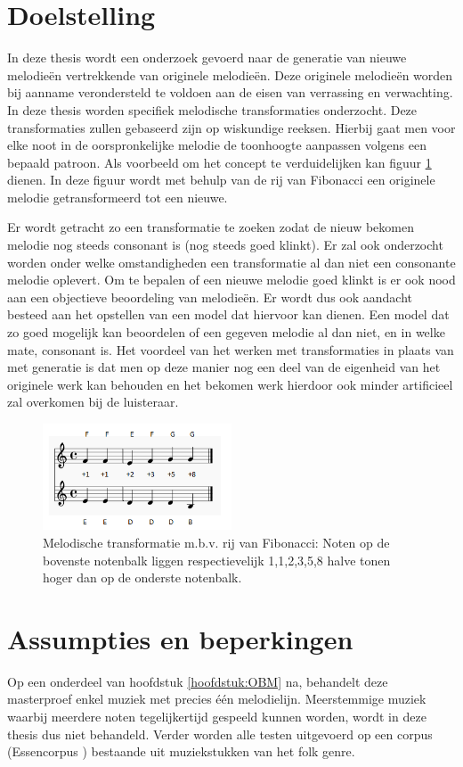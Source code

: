 \section{Doelstelling}
In deze thesis wordt een onderzoek gevoerd naar de generatie van nieuwe melodie\"en vertrekkende van originele melodie\"en. Deze originele melodie\"en worden bij aanname verondersteld te voldoen aan de eisen van verrassing en verwachting. In deze thesis worden specifiek melodische transformaties onderzocht. Deze transformaties zullen gebaseerd zijn op wiskundige reeksen. Hierbij gaat men voor elke noot in de oorspronkelijke melodie de toonhoogte aanpassen volgens een bepaald patroon. Als voorbeeld om het concept te verduidelijken kan figuur \ref{figuur:fibo} dienen. In deze figuur wordt met behulp van de rij van Fibonacci een originele melodie getransformeerd tot een nieuwe. 

Er wordt getracht zo een transformatie te zoeken zodat de nieuw bekomen melodie nog steeds consonant is (nog steeds goed klinkt). Er zal ook onderzocht worden onder welke omstandigheden een transformatie al dan niet een consonante melodie oplevert. Om te bepalen of een nieuwe melodie goed klinkt is er ook nood aan een objectieve beoordeling van melodie\"en. Er wordt dus ook aandacht besteed aan het opstellen van een model dat hiervoor kan dienen. Een model dat zo goed mogelijk kan beoordelen of een gegeven melodie al dan niet, en in welke mate, consonant is. Het voordeel van het werken met transformaties in plaats van met generatie is dat men op deze manier nog een deel van de eigenheid van het originele werk kan behouden en het bekomen werk hierdoor ook minder artificieel zal overkomen bij de luisteraar.

\begin{figure}[!ht]
  \centering
  \includegraphics[width=0.5\textwidth]{0_Inleiding/fibo}
  \caption{Melodische transformatie m.b.v. rij van Fibonacci: Noten op de bovenste notenbalk liggen respectievelijk 1,1,2,3,5,8 halve tonen hoger dan op de onderste notenbalk.}
  \label{figuur:fibo}
\end{figure}

\section{Assumpties en beperkingen}
Op een onderdeel van hoofdstuk \ref{hoofdstuk:OBM} na, behandelt deze masterproef enkel muziek met precies \'e\'en melodielijn. Meerstemmige muziek waarbij meerdere noten tegelijkertijd gespeeld kunnen worden, wordt in deze thesis dus niet behandeld. Verder worden alle testen uitgevoerd op een corpus (Essencorpus \cite{url:essen}) bestaande uit muziekstukken van het folk genre.

